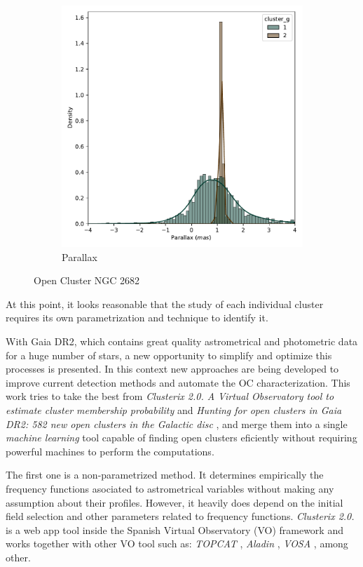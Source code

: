\documentclass[11pt, a4paper, english]{book}
\begin{document}
\begin{figure}[htbp]
\begin{subfigure}[t]{0.45\textwidth}
    \includegraphics[width=\textwidth]{../figures/parallax_ngc_2682.pdf}
    \caption{Parallax}
    \label{fig:parallax_ngc_2682}
  \end{subfigure}
  \caption{Open Cluster NGC 2682}
\end{figure}

At this point, it looks reasonable that the study of each individual cluster requires its own parametrization and technique
to identify it.

With Gaia DR2, which contains great quality astrometrical and photometric data for a huge number of stars,
a new opportunity to simplify and optimize this processes is presented.
In this context new approaches are being developed to improve current detection methods and automate the OC characterization.
This work tries to take the best from \emph{Clusterix 2.0. A Virtual Observatory tool to estimate cluster membership probability}
\cite{balaguer2020clusterix} and \emph{Hunting for open clusters in Gaia DR2: 582 new open clusters
in the Galactic disc} \cite{castro2020hunting}, and merge them into a single \emph{machine learning}
tool capable of finding open clusters eficiently without requiring powerful machines to perform the computations.

The first one is a non-parametrized method. It determines empirically the frequency functions asociated to astrometrical variables
without making any assumption about their profiles. However, it heavily does depend on the initial field selection and other
parameters related to frequency functions. \emph{Clusterix 2.0.} is a web app tool inside the Spanish Virtual Observatory
(VO) framework and works together with other VO tool such as:
\emph{TOPCAT} \cite{taylor2005topcat},
\emph{Aladin} \cite{bonnarel2000aladin},
\emph{VOSA} \cite{bayo2008vosa}, among other.
\end{document}
